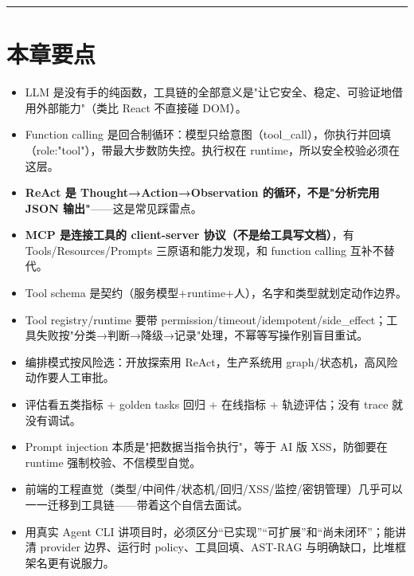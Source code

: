 \bigskip\hrule\bigskip

\section{本章要点}

\begin{itemize}[leftmargin=2em]
\item LLM 是没有手的纯函数，工具链的全部意义是"让它安全、稳定、可验证地借用外部能力"（类比 React 不直接碰 DOM）。
\item Function calling 是回合制循环：模型只给意图（tool\_call），你执行并回填（role:"tool"），带最大步数防失控。执行权在 runtime，所以安全校验必须在这层。
\item \textbf{ReAct 是 Thought→Action→Observation 的循环，不是"分析完用 JSON 输出"}——这是常见踩雷点。
\item \textbf{MCP 是连接工具的 client-server 协议（不是给工具写文档）}，有 Tools/Resources/Prompts 三原语和能力发现，和 function calling 互补不替代。
\item Tool schema 是契约（服务模型+runtime+人），名字和类型就划定动作边界。
\item Tool registry/runtime 要带 permission/timeout/idempotent/side\_effect；工具失败按"分类→判断→降级→记录"处理，不幂等写操作别盲目重试。
\item 编排模式按风险选：开放探索用 ReAct，生产系统用 graph/状态机，高风险动作要人工审批。
\item 评估看五类指标 + golden tasks 回归 + 在线指标 + 轨迹评估；没有 trace 就没有调试。
\item Prompt injection 本质是"把数据当指令执行"，等于 AI 版 XSS，防御要在 runtime 强制校验、不信模型自觉。
\item 前端的工程直觉（类型/中间件/状态机/回归/XSS/监控/密钥管理）几乎可以一一迁移到工具链——带着这个自信去面试。
\item 用真实 Agent CLI 讲项目时，必须区分“已实现”“可扩展”和“尚未闭环”；能讲清 provider 边界、运行时 policy、工具回填、AST-RAG 与明确缺口，比堆框架名更有说服力。
\end{itemize}
